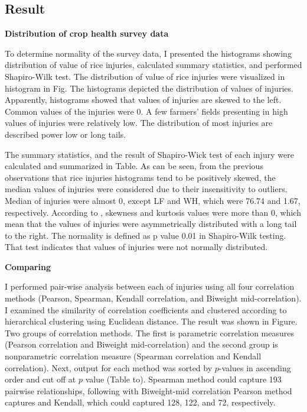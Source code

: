 \subsection*{Result}

\textbf{Distribution of crop health survey data}

To determine normality of the survey data, I presented the histograms showing distribution of value of rice injuries, calculated summary statistics, and performed Shapiro-Wilk test. The distribution of value of rice injuries were visualized in histogram in Fig. The histograms depicted the distribution of values of injuries. Apparently, histograms showed that values of injuries are skewed to the left. Common values of the injuries were 0. A few farmers’ fields presenting in high values of injuries were relatively low. The distribution of most injuries are described power low or long tails. 

The summary statistics, and the result of Shapiro-Wick test of each injury were calculated and summarized in Table.  As can be seen, from the previous observations that rice injuries histograms tend to be positively skewed, the median values of injuries were considered due to their insensitivity to outliers. Median of injuries were almost 0, except LF and WH, which were 76.74 and 1.67, respectively. According to \citet{Doane_2011_Measuring}, skewness and kurtosis values were more than 0, which mean that the values of injuries were asymmetrically distributed with a long tail to the right. The normality is defined as p value 0.01 in Shapiro-Wilk testing. That test indicates that values of injuries were not normally distributed.

\textbf{Comparing}

I performed pair-wise analysis between each of injuries using all four correlation methods (Pearson, Spearman, Kendall correlation, and Biweight mid-correlation). I examined the similarity of correlation coefficients and clustered according to hierarchical clustering using Euclidean distance. The result was shown in Figure. Two groups of correlation methods. The first is parametric correlation measures (Pearson correlation and Biweight mid-correlation) and the second group is nonparametric correlation measure (Spearman correlation and Kendall correlation). Next, output for each method was sorted by $p$-values in ascending order and cut off at $p$ value  (Table to).  Spearman method could capture 193 pairwise relationships, following with Biweight-mid correlation Pearson method captures and Kendall, which could captured 128, 122, and 72, respectively.

